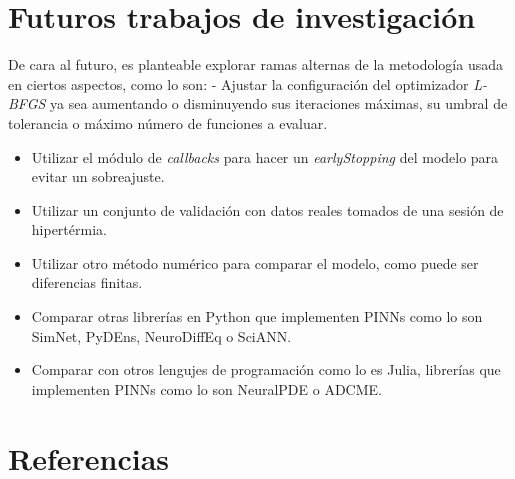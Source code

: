 \documentclass[
  spanish,
  us-letterpaper,
]{scrreprt}
\theoremstyle{definition}
\theoremstyle{plain}
\theoremstyle{remark}
\begin{document}

\chapter{Futuros trabajos de
investigación}\label{futuros-trabajos-de-investigaciuxf3n}

De cara al futuro, es planteable explorar ramas alternas de la
metodología usada en ciertos aspectos, como lo son: - Ajustar la
configuración del optimizador \emph{L-BFGS} ya sea aumentando o
disminuyendo sus iteraciones máximas, su umbral de tolerancia o máximo
número de funciones a evaluar.

\begin{itemize}
\item
  Utilizar el módulo de \emph{callbacks} para hacer un
  \emph{earlyStopping} del modelo para evitar un sobreajuste.
\item
  Utilizar un conjunto de validación con datos reales tomados de una
  sesión de hipertérmia.
\item
  Utilizar otro método numérico para comparar el modelo, como puede ser
  diferencias finitas.
\item
  Comparar otras librerías en Python que implementen PINNs como lo son
  SimNet, PyDEns, NeuroDiffEq o SciANN.
\item
  Comparar con otros lengujes de programación como lo es Julia,
  librerías que implementen PINNs como lo son NeuralPDE o ADCME.
\end{itemize}


\chapter*{Referencias}\label{referencias}

\end{document}
